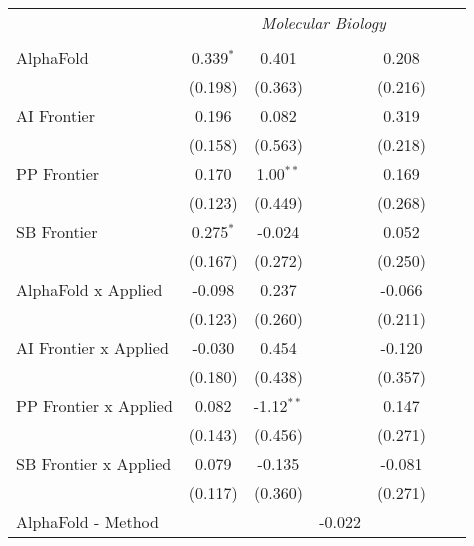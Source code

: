 \begin{tabular}{lcccccc}
 & \multicolumn{6}{c}{\textit{Molecular Biology}} \\ \\
   AlphaFold                      & 0.339$^{*}$ & 0.401        &               & 0.208   &        &   \\   
                                  & (0.198)     & (0.363)      &               & (0.216) &        &   \\   
   AI Frontier                    & 0.196       & 0.082        &               & 0.319   &        &   \\   
                                  & (0.158)     & (0.563)      &               & (0.218) &        &   \\   
   PP Frontier                    & 0.170       & 1.00$^{**}$  &               & 0.169   &        &   \\   
                                  & (0.123)     & (0.449)      &               & (0.268) &        &   \\   
   SB Frontier                    & 0.275$^{*}$ & -0.024       &               & 0.052   &        &   \\   
                                  & (0.167)     & (0.272)      &               & (0.250) &        &   \\   
   AlphaFold x Applied            & -0.098      & 0.237        &               & -0.066  &        &   \\   
                                  & (0.123)     & (0.260)      &               & (0.211) &        &   \\   
   AI Frontier x Applied          & -0.030      & 0.454        &               & -0.120  &        &   \\   
                                  & (0.180)     & (0.438)      &               & (0.357) &        &   \\   
   PP Frontier x Applied          & 0.082       & -1.12$^{**}$ &               & 0.147   &        &   \\   
                                  & (0.143)     & (0.456)      &               & (0.271) &        &   \\   
   SB Frontier x Applied          & 0.079       & -0.135       &               & -0.081  &        &   \\   
                                  & (0.117)     & (0.360)      &               & (0.271) &        &   \\   
   AlphaFold - Method             &             &              & -0.022        &         &        &   \\   

\end{tabular}
